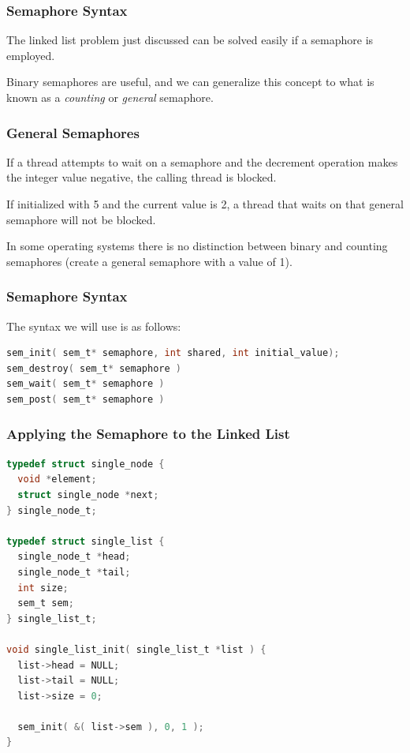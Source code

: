 \begin{frame}
	\frametitle{Semaphore Syntax}

	The linked list problem just discussed can be solved easily if a semaphore is employed.

	Binary semaphores are useful, and we can generalize this concept to what is known as a \textit{counting} or \textit{general} semaphore.

\end{frame}


\begin{frame}
	\frametitle{General Semaphores}

	If a thread attempts to wait on a semaphore and the decrement operation makes the integer value negative, the calling thread is blocked.

	If initialized with 5 and the current value is 2, a thread that waits on that general semaphore will not be blocked.

	In some operating systems there is no distinction between binary and counting semaphores (create a general semaphore with a value of 1).

\end{frame}

\begin{frame}[fragile]
	\frametitle{Semaphore Syntax}

	The syntax we will use is as follows:

	\begin{lstlisting}[language=C]
sem_init( sem_t* semaphore, int shared, int initial_value);
sem_destroy( sem_t* semaphore )
sem_wait( sem_t* semaphore )
sem_post( sem_t* semaphore )
\end{lstlisting}

\end{frame}

\begin{frame}[fragile]
	\frametitle{Applying the Semaphore to the Linked List}

	\begin{lstlisting}[language=C]
typedef struct single_node {
  void *element;
  struct single_node *next;
} single_node_t;

typedef struct single_list {
  single_node_t *head;
  single_node_t *tail;
  int size;
  sem_t sem;
} single_list_t;

void single_list_init( single_list_t *list ) {
  list->head = NULL;
  list->tail = NULL;
  list->size = 0;

  sem_init( &( list->sem ), 0, 1 );
}
\end{lstlisting}

\end{frame}

